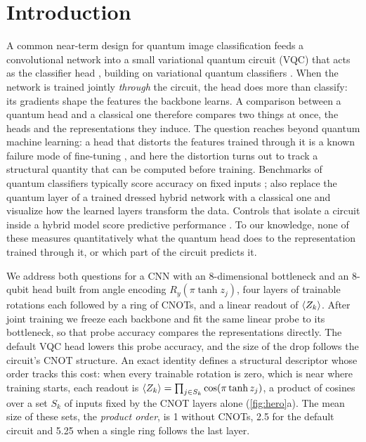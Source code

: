 \section{Introduction}
\label{sec:intro}

A common near-term design for quantum image classification feeds a convolutional network
into a small variational quantum circuit (VQC) that acts as the classifier head
\citep{mari2020}, building on variational quantum classifiers
\citep{mitarai2018,havlicek2019,benedetti2019,cerezo2021}. When the network is trained jointly
\emph{through} the circuit, the head does more than classify: its gradients shape the
features the backbone learns. A comparison between a quantum head and a classical one
therefore compares two things at once, the heads and the representations they induce.
The question reaches beyond quantum machine learning: a head that distorts the features
trained through it is a known failure mode of fine-tuning \citep{kumar2022}, and here the
distortion turns out to track a structural quantity that can be computed before training.
Benchmarks of quantum classifiers typically score accuracy on fixed inputs
\citep[e.g.][]{fulton2026,slattery2022}; \citet{bowles2024} also replace the quantum layer of a trained
dressed hybrid network with a classical one and visualize how the learned layers transform
the data. Controls that isolate a circuit inside a hybrid model score predictive performance
\citep{kolle2024,elhag2026}. To our knowledge, none of these measures quantitatively what the quantum head
does to the representation trained through it, or which part of the circuit
predicts it.

We address both questions for a CNN with an 8-dimensional bottleneck and an 8-qubit head
built from angle encoding $R_y(\pi\tanh z_j)$, four layers of trainable rotations each
followed by a ring of CNOTs, and a linear readout of $\langle Z_{k}\rangle$. After joint training we
freeze each backbone and fit the same linear probe to its bottleneck, so that probe
accuracy compares the representations directly. The default VQC head lowers this probe
accuracy, and the size of the drop follows the circuit's CNOT structure. An exact identity
defines a structural descriptor whose order tracks this cost: when every trainable rotation
is zero, which is near where
training starts, each readout is
$\langle Z_{k}\rangle=\prod_{j\in S_k}\cos(\pi\tanh z_j)$, a product of cosines over a set $S_k$ of
inputs fixed by the CNOT layers alone (\cref{fig:hero}a). The mean size of these sets, the
\emph{product order}, is 1 without CNOTs, 2.5 for the default circuit and 5.25 when a
single ring follows the last layer.

